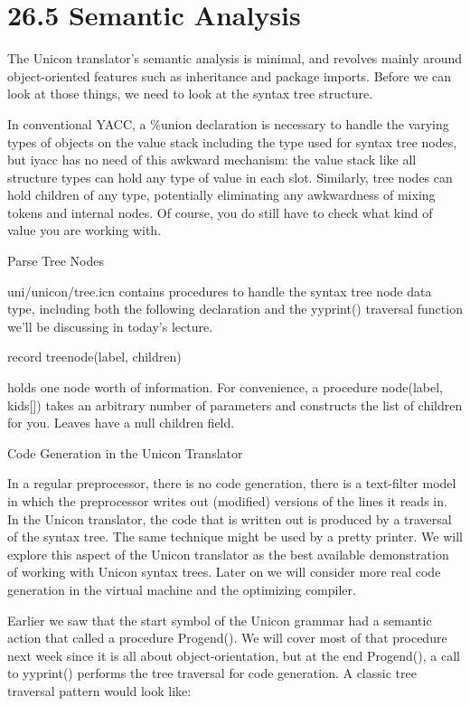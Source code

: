 \section[26.5 Semantic Analysis]{26.5 Semantic Analysis}

The Unicon translator's semantic analysis is minimal, and revolves
mainly around object-oriented features such as inheritance and package
imports. Before we can look at those things, we need to look at the
syntax tree structure.

In conventional YACC, a \%union declaration is necessary to handle the
varying types of objects on the value stack including the type used
for syntax tree nodes, but iyacc has no need of this awkward
mechanism: the value stack like all structure types can hold any type
of value in each slot. Similarly, tree nodes can hold children of any
type, potentially eliminating any awkwardness of mixing tokens and
internal nodes. Of course, you do still have to check what kind of
value you are working with.

{\sffamily
Parse Tree Nodes }

uni/unicon/tree.icn contains procedures to handle the syntax tree node
data type, including both the following declaration and the yyprint()
traversal function we'll be discussing in today's lecture.

{\ttfamily\mdseries
record treenode(label, children)}

\noindent holds one node worth of information. For convenience, a
procedure node(label, kids[]) takes an arbitrary number of parameters
and constructs the list of children for you. Leaves have a null
children field.

{\sffamily
{\textquotedbl}Code Generation{\textquotedbl} in the Unicon Translator }

In a regular preprocessor, there is no code generation, there is a
text-filter model in which the preprocessor writes out (modified)
versions of the lines it reads in. In the Unicon translator, the code
that is written out is produced by a traversal of the syntax tree. The
same technique might be used by a {\textquotedbl}pretty
printer{\textquotedbl}. We will explore this aspect of the Unicon
translator as the best available demonstration of working with Unicon
syntax trees. Later on we will consider more
{\textquotedbl}real{\textquotedbl} code generation in the virtual
machine and the optimizing compiler.

Earlier we saw that the start symbol of the Unicon grammar had a
semantic action that called a procedure Progend(). We will cover most
of that procedure next week since it is all about object-orientation,
but at the end Progend(), a call to yyprint() performs the tree
traversal for code generation. A classic tree traversal pattern would
look like:

